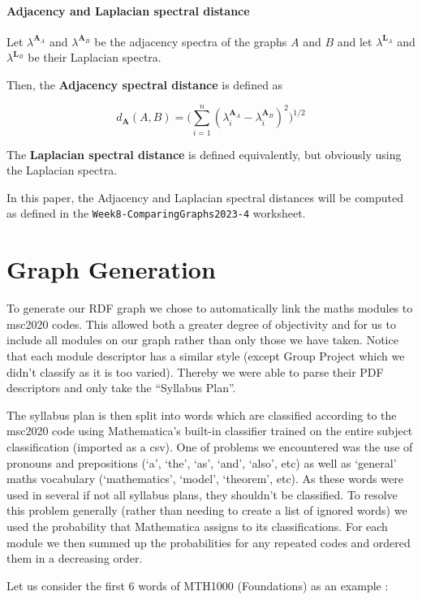 \documentclass[english, 12pt]{article}
\begin{document}
\paragraph{Adjacency and Laplacian spectral distance} \label{sec:spectral_distance}
Let $\lambda^{\mathbf A_A}$ and  $\lambda^{\mathbf A_B}$ be the adjacency spectra of the graphs $A$ and $B$ and let $\lambda^{\mathbf L_A}$ and  $\lambda^{\mathbf L_B}$ be their Laplacian spectra.

Then, the {\bf Adjacency spectral distance} is defined as

$$d_{\mathbf A}(A,B) = \Bigg( \sum_{i=1}^n (\lambda_i^{\mathbf A_A} - \lambda_i^{\mathbf A_B})^2\Bigg)^{1/2}$$

The {\bf Laplacian spectral distance} is defined equivalently, but obviously using the Laplacian spectra.

In this paper, the Adjacency and Laplacian spectral distances will be computed as defined in the \texttt{Week8-ComparingGraphs2023-4} worksheet.

\section{Graph Generation} \label{sec:graph_gen}
To generate our RDF graph we chose to automatically link the maths modules to msc2020\cite{msc_2010} codes. This allowed both a greater degree of objectivity and for us to include all modules on our graph rather than only those we have taken. Notice that each module descriptor has a similar style (except Group Project which we didn't classify as it is too varied). Thereby we were able to parse their PDF descriptors and only take the ``Syllabus Plan''.

The syllabus plan is then split into words which are classified according to the msc2020 code using Mathematica's built-in classifier trained on the entire subject classification (imported as a csv). One of problems we encountered was the use of pronouns and prepositions (`a', `the', `as', `and', `also', etc) as well as `general' maths vocabulary (`mathematics', `model', `theorem', etc). As these words were used in several if not all syllabus plans, they shouldn't be classified. To resolve this problem generally (rather than needing to create a list of ignored words) we used the probability that Mathematica assigns to its classifications. For each module we then summed up the probabilities for any repeated codes and ordered them in a decreasing order.

Let us consider the first 6 words of MTH1000 (Foundations) as an example :
\end{document}

